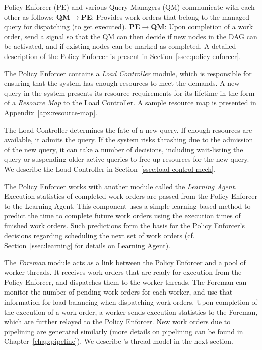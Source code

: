 Policy Enforcer (PE) and various Query Managers (QM) communicate with each other as follows:
\textbf{QM}$\rightarrow$\textbf{PE}: Provides work orders that belong to the managed query for dispatching (to get executed).
\textbf{PE}$\rightarrow$\textbf{QM}: Upon completion of a work order, send a signal so that the QM can then decide if new nodes in the DAG can be activated, and if existing nodes can be marked as completed.
A detailed description of the Policy Enforcer is present in Section~\ref{ssec:policy-enforcer}. 

The Policy Enforcer contains a \textit{Load Controller} module, which is
responsible for ensuring that the system has enough resources to meet the
demands.
A new query in the system presents its resource requirements for its lifetime in the form of a \textit{Resource Map} to the Load Controller.
A sample resource map is presented in Appendix~\ref{apx:resource-map}.

The Load Controller determines the fate of a new query. 
If enough resources are available, it admits the query.
If the system risks thrashing due to the admission of the new query, it can take a number of decisions, including wait-listing the query or suspending older active queries to free up resources for the new query.
We describe the Load Controller in Section~\ref{ssec:load-control-mech}.

The Policy Enforcer works with another module called the \textit{Learning Agent}. 
Execution statistics of completed work orders are passed from the Policy Enforcer to the Learning Agent.
This component uses a simple learning-based method to predict the time to 
complete future work orders using the execution times of finished work orders. 
Such predictions form the basis for the Policy Enforcer's decisions regarding scheduling the next set of work orders (cf. Section~\ref{ssec:learning} for details on Learning Agent).

The \textit{Foreman} module acts as a link between the Policy Enforcer and a pool of worker threads. 
It receives work orders that are ready for execution from the Policy Enforcer, and dispatches them to the worker threads. 
The Foreman can monitor the number of pending work orders for each worker, and 
use that information for load-balancing when dispatching work orders.
Upon completion of the execution of a work order, a worker sends execution statistics to the Foreman, which are further relayed to the Policy Enforcer.
New work orders due to pipelining are generated similarly (more details on pipelining can be found in Chapter~\ref{chap:pipeline}). 
We describe \sys{}'s thread model in the next section. 

